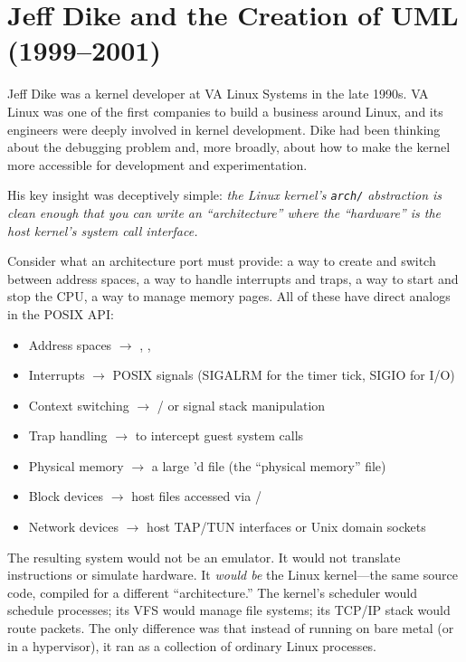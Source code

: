 \section{Jeff Dike and the Creation of UML (1999--2001)}
\label{sec:history-creation}

Jeff Dike was a kernel developer at VA Linux Systems in the late 1990s.  VA
Linux was one of the first companies to build a business around Linux, and its
engineers were deeply involved in kernel development.  Dike had been thinking
about the debugging problem and, more broadly, about how to make the kernel more
accessible for development and experimentation.

His key insight was deceptively simple: \emph{the Linux kernel's
\texttt{arch/} abstraction is clean enough that you can write an
``architecture'' where the ``hardware'' is the host kernel's system call
interface.}

Consider what an architecture port must provide: a way to create and switch
between address spaces, a way to handle interrupts and traps, a way to start and
stop the CPU, a way to manage memory pages.  All of these have direct analogs in
the POSIX API:

\begin{itemize}[nosep]
  \item Address spaces $\to$ , , 
  \item Interrupts $\to$ POSIX signals (SIGALRM for the timer tick, SIGIO for I/O)
  \item Context switching $\to$ / or signal stack manipulation
  \item Trap handling $\to$  to intercept guest system calls
  \item Physical memory $\to$ a large 'd file (the ``physical memory'' file)
  \item Block devices $\to$ host files accessed via /
  \item Network devices $\to$ host TAP/TUN interfaces or Unix domain sockets
\end{itemize}

\noindent
The resulting system would not be an emulator.  It would not translate
instructions or simulate hardware.  It \emph{would be} the Linux kernel---the
same source code, compiled for a different ``architecture.''  The kernel's
scheduler would schedule processes; its VFS would manage file systems; its TCP/IP
stack would route packets.  The only difference was that instead of running on
bare metal (or in a hypervisor), it ran as a collection of ordinary Linux
processes.

